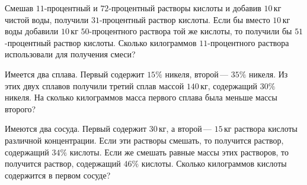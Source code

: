 \begin{class}[number=1]
\begin{listofex}
		\item Смешав \(11\)-процентный и \(72\)-процентный растворы кислоты и добавив \(10\) кг чистой воды, получили \(31\)-процентный раствор кислоты. Если бы вместо \(10\) кг воды добавили \(10\) кг \(50\)-процентного раствора той же кислоты, то получили бы \(51\)-процентный раствор кислоты. Сколько килограммов \(11\)-процентного раствора использовали для получения смеси?
		
		\item Имеется два сплава. Первый содержит \(15\%\) никеля, второй --- \(35\%\) никеля. Из этих двух сплавов получили третий сплав массой \(140\) кг, содержащий \(30\%\) никеля. На сколько килограммов масса первого сплава была меньше массы второго?
		
		
		\item Имеются два сосуда. Первый содержит \(30\) кг, а второй --- \(15\) кг раствора кислоты различной концентрации. Если эти растворы смешать, то получится раствор, содержащий \(34\%\) кислоты. Если же смешать равные массы этих растворов, то получится раствор, содержащий \(46\%\) кислоты. Сколько килограммов кислоты содержится в первом сосуде?
	\end{listofex}
\end{class}


